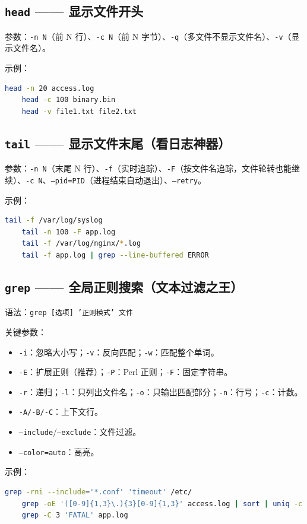 \subsection*{\texttt{head} —— 显示文件开头} 参数：\texttt{-n N}（前 N 行）、\texttt{-c N}（前 N 字节）、\texttt{-q}（多文件不显示文件名）、\texttt{-v}（显示文件名）。

示例：
\begin{lstlisting}[language=bash]
	head -n 20 access.log
	head -c 100 binary.bin
	head -v file1.txt file2.txt
\end{lstlisting}

\subsection*{\texttt{tail} —— 显示文件末尾（看日志神器）} 参数：\texttt{-n N}（末尾 N 行）、\texttt{-f}（实时追踪）、\texttt{-F}（按文件名追踪，文件轮转也能继续）、\texttt{-c N}、\texttt{--pid=PID}（进程结束自动退出）、\texttt{--retry}。

示例：
\begin{lstlisting}[language=bash]
	tail -f /var/log/syslog
	tail -n 100 -F app.log
	tail -f /var/log/nginx/*.log
	tail -f app.log | grep --line-buffered ERROR
\end{lstlisting}

\subsection*{\texttt{grep} —— 全局正则搜索（文本过滤之王）} 语法：\texttt{grep [选项] '正则模式' 文件}

关键参数：
\begin{itemize}
\item \texttt{-i}：忽略大小写；\texttt{-v}：反向匹配；\texttt{-w}：匹配整个单词。
\item \texttt{-E}：扩展正则（推荐）；\texttt{-P}：Perl 正则；\texttt{-F}：固定字符串。
\item \texttt{-r}：递归；\texttt{-l}：只列出文件名；\texttt{-o}：只输出匹配部分；\texttt{-n}：行号；\texttt{-c}：计数。
\item \texttt{-A/-B/-C}：上下文行。
\item \texttt{--include}/\texttt{--exclude}：文件过滤。
\item \texttt{--color=auto}：高亮。
\end{itemize}

示例：
\begin{lstlisting}[language=bash]
	grep -rni --include='*.conf' 'timeout' /etc/
	grep -oE '([0-9]{1,3}\.){3}[0-9]{1,3}' access.log | sort | uniq -c
	grep -C 3 'FATAL' app.log
\end{lstlisting}

